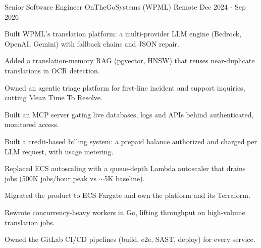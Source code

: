 

\begin{cventries}

  \cventry
    {Senior Software Engineer} %
    {OnTheGoSystems (WPML)} %
    {Remote} %
    {Dec 2024 - Sep 2026} %
    {
      \begin{cvitems}
        \item {Built WPML's translation platform: a multi-provider LLM engine (Bedrock, OpenAI, Gemini) with fallback chains and JSON repair.}
        \item {Added a translation-memory RAG (pgvector, HNSW) that reuses near-duplicate translations in OCR detection.}
        \item {Owned an agentic triage platform for first-line incident and support inquiries, cutting Mean Time To Resolve.}
        \item {Built an MCP server gating live databases, logs and APIs behind authenticated, monitored access.}
        \item {Built a credit-based billing system: a prepaid balance authorized and charged per LLM request, with usage metering.}
        \item {Replaced ECS autoscaling with a queue-depth Lambda autoscaler that drains jobs (500K jobs/hour peak vs $\sim$5K baseline).}
        \item {Migrated the product to ECS Fargate and own the platform and its Terraform.}
        \item {Rewrote concurrency-heavy workers in Go, lifting throughput on high-volume translation jobs.}
        \item {Owned the GitLab CI/CD pipelines (build, e2e, SAST, deploy) for every service.}
      \end{cvitems}
    }


\end{cventries}
